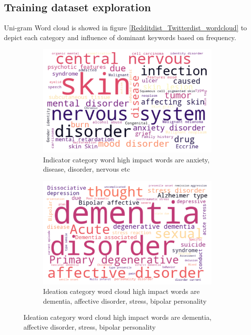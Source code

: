 \documentclass[sn-mathphys,Numbered]{sn-jnl}%
\theoremstyle{thmstyleone}%
\theoremstyle{thmstyletwo}%
\theoremstyle{thmstylethree}%
\begin{document}
\subsection{Training dataset exploration}
Uni-gram Word cloud is showed in figure \ref{Redditdist_Twitterdist_wordcloud} to depict each category and influence of dominant keywords based on frequency.  
\begin{figure}[h!]
\centering
\begin{subfigure}{0.45\textwidth}
    \includegraphics[width=\textwidth]{indicator_word_cloud.png}
    \caption{Indicator category word high impact words are anxiety, disease, disorder, nervous etc}
    \label{Redditdist}
\end{subfigure}
\hfill
\begin{subfigure}{0.45\textwidth}
    \includegraphics[width=\textwidth]{Ideation_word_cloud.png}
    \caption{Ideation category word cloud high impact words are dementia, affective disorder, stress, bipolar personality}
    \label{Twitterdist}

\end{subfigure}
\end{figure}
\end{document}

